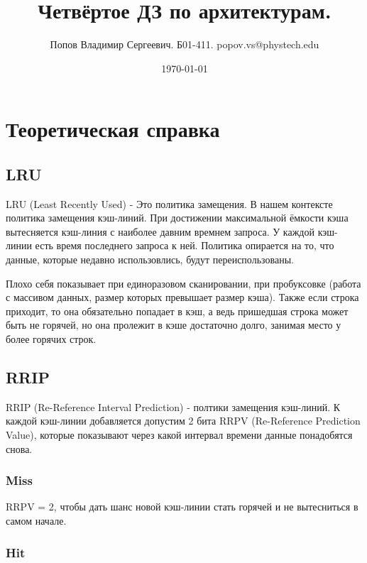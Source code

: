 \documentclass[12pt]{extarticle}
\title{Четвёртое ДЗ по архитектурам.}
\author{Попов Владимир Сергеевич. Б01-411. popov.vs@phystech.edu}
\date{\today}
\begin{document}
\maketitle

\newpage

\tableofcontents

\newpage

\section{Теоретическая справка}

\subsection{LRU}

LRU (Least Recently Used) - Это политика замещения. В нашем контексте политика замещения кэш-линий. При достижении максимальной ёмкости кэша вытесняется кэш-линия с наиболее давним времнем запроса. У каждой кэш-линии есть время последнего запроса к ней. Политика опирается на то, что данные, которые недавно использовлись, будут переиспользованы. 

Плохо себя показывает при единоразовом сканировании, при пробуксовке (работа с массивом данных, размер которых превышает размер кэша). Также если строка приходит, то она обязательно попадает в кэш, а ведь пришедшая строка может быть не горячей, но она пролежит в кэше достаточно долго, занимая место у более горячих строк.

\subsection{RRIP}

RRIP (Re-Reference Interval Prediction) - полтики замещения кэш-линий. К каждой кэш-линии добавляется допустим 2 бита RRPV (Re-Reference Prediction Value), которые показывают через какой интервал времени данные понадобятся снова. 

\subsubsection{Miss}

RRPV = 2, чтобы дать шанс новой кэш-линии стать горячей и не вытесниться в самом начале.

\subsubsection{Hit}
\end{document}
